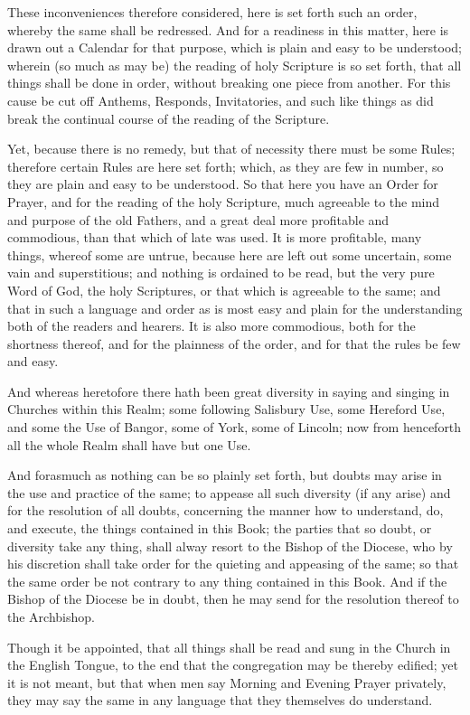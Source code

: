 These inconveniences therefore considered, here is set forth such an order, whereby the same shall be redressed. And for a readiness in this matter, here is drawn out a Calendar for that purpose, which is plain and easy to be understood; wherein (so much as may be) the reading of holy Scripture is so set forth, that all things shall be done in order, without breaking one piece from another. For this cause be cut off Anthems, Responds, Invitatories, and such like things as did break the continual course of the reading of the Scripture.

Yet, because there is no remedy, but that of necessity there must be some Rules; therefore certain Rules are here set forth; which, as they are few in number, so they are plain and easy to be understood. So that here you have an Order for Prayer, and for the reading of the holy Scripture, much agreeable to the mind and purpose of the old Fathers, and a great deal more profitable and commodious, than that which of late was used. It is more profitable, many things, whereof some are untrue, because here are left out some uncertain, some vain and superstitious; and nothing is ordained to be read, but the very pure Word of God, the holy Scriptures, or that which is agreeable to the same; and that in such a language and order as is most easy and plain for the understanding both of the readers and hearers. It is also more commodious, both for the shortness thereof, and for the plainness of the order, and for that the rules be few and easy.

And whereas heretofore there hath been great diversity in saying and singing in Churches within this Realm; some following Salisbury Use, some Hereford Use, and some the Use of Bangor, some of York, some of Lincoln; now from henceforth all the whole Realm shall have but one Use.

And forasmuch as nothing can be so plainly set forth, but doubts may arise in the use and practice of the same; to appease all such diversity (if any arise) and for the resolution of all doubts, concerning the manner how to understand, do, and execute, the things contained in this Book; the parties that so doubt, or diversity take any thing, shall alway resort to the Bishop of the Diocese, who by his discretion shall take order for the quieting and appeasing of the same; so that the same order be not contrary to any thing contained in this Book. And if the Bishop of the Diocese be in doubt, then he may send for the resolution thereof to the Archbishop.

Though it be appointed, that all things shall be read and sung in the Church in the English Tongue, to the end that the congregation may be thereby edified; yet it is not meant, but that when men say Morning and Evening Prayer privately, they may say the same in any language that they themselves do understand.

